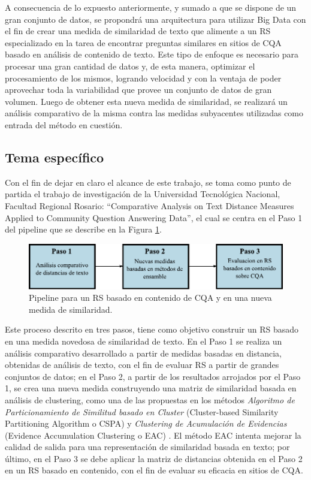 \bigskip A consecuencia de lo expuesto anteriormente, y sumado a que se dispone de un gran conjunto de datos, se propondrá una arquitectura para utilizar Big Data con el fin de crear una medida de similaridad de texto que alimente a un RS especializado en la tarea de encontrar preguntas similares en sitios de CQA basado en análisis de contenido de texto. Este tipo de enfoque es necesario para procesar una gran cantidad de datos y, de esta manera, optimizar el procesamiento de los mismos, logrando velocidad y con la ventaja de poder aprovechar toda la variabilidad que provee un conjunto de datos de gran volumen. Luego de obtener esta nueva medida de similaridad, se realizará un análisis comparativo de la misma contra las medidas subyacentes utilizadas como entrada del método en cuestión.

\subsection{Tema específico}
\noindent Con el fin de dejar en claro el alcance de este trabajo, se toma como punto de partida el trabajo de investigación de la Universidad Tecnológica Nacional, Facultad Regional Rosario: “Comparative Analysis on Text Distance Measures Applied to Community Question Answering Data”, el cual se centra en el Paso 1 del pipeline que se describe en la Figura \ref{fig:pipeline}.
\bigskip
\begin{figure}[h!]
	\centering
	\includegraphics[width=0.9\linewidth]{5_introduccion/imagenes/pipeline}
	\caption{Pipeline para un RS basado en contenido de CQA y en una nueva medida de similaridad.}
	\label{fig:pipeline}
\end{figure}

Este proceso descrito en tres pasos, tiene como objetivo construir un RS basado en una medida novedosa de similaridad de texto. En el Paso 1 se realiza un análisis comparativo desarrollado a partir de medidas basadas en distancia, obtenidas de análisis de texto, con el fin de evaluar RS a partir de grandes conjuntos de datos; en el Paso 2, a partir de los resultados arrojados por el Paso 1, se crea una nueva medida construyendo una matriz de similaridad basada en análisis de clustering, como una de las propuestas en los métodos \textit{Algoritmo de Particionamiento de Similitud basado en Cluster} (Cluster-based Similarity Partitioning Algorithm o CSPA) \citep{strehl33knowledge} y \textit{Clustering de Acumulación de Evidencias} (Evidence Accumulation Clustering o EAC) \citep{fred2005combining}. El método EAC intenta mejorar la calidad de salida para una representación de similaridad basada en texto; por último, en el Paso 3 se debe aplicar la matriz de distancias obtenida en el Paso 2 en un RS basado en contenido, con el fin de evaluar su eficacia en sitios de CQA.

